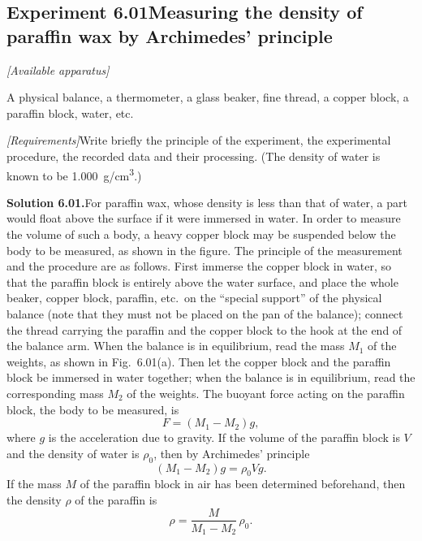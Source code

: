 \subsection*{Experiment 6.01\quad Measuring the density of paraffin wax by Archimedes' principle}

\noindent\textit{[Available apparatus]}

A physical balance, a thermometer, a glass beaker, fine thread, a copper block, a paraffin block, water, etc.

\noindent\textit{[Requirements]}\quad Write briefly the principle of the experiment, the experimental procedure, the recorded data and their processing. (The density of water is known to be \SI{1.000}{g/cm^3}.)

\medskip
\noindent\textbf{Solution 6.01.}\quad For paraffin wax, whose density is less than that of water, a part would float above the surface if it were immersed in water. In order to measure the volume of such a body, a heavy copper block may be suspended below the body to be measured, as shown in the figure. The principle of the measurement and the procedure are as follows. First immerse the copper block in water, so that the paraffin block is entirely above the water surface, and place the whole beaker, copper block, paraffin, etc.\ on the ``special support'' of the physical balance (note that they must not be placed on the pan of the balance); connect the thread carrying the paraffin and the copper block to the hook at the end of the balance arm. When the balance is in equilibrium, read the mass $M_1$ of the weights, as shown in Fig.~6.01(a). Then let the copper block and the paraffin block be immersed in water together; when the balance is in equilibrium, read the corresponding mass $M_2$ of the weights. The buoyant force acting on the paraffin block, the body to be measured, is
\begin{equation*}
F=(M_1-M_2)g,
\end{equation*}
where $g$ is the acceleration due to gravity. If the volume of the paraffin block is $V$ and the density of water is $\rho_0$, then by Archimedes' principle
\begin{equation*}
(M_1-M_2)g=\rho_0 Vg.
\end{equation*}
If the mass $M$ of the paraffin block in air has been determined beforehand, then the density $\rho$ of the paraffin is
\begin{equation*}
\rho=\frac{M}{M_1-M_2}\,\rho_0.
\end{equation*}

